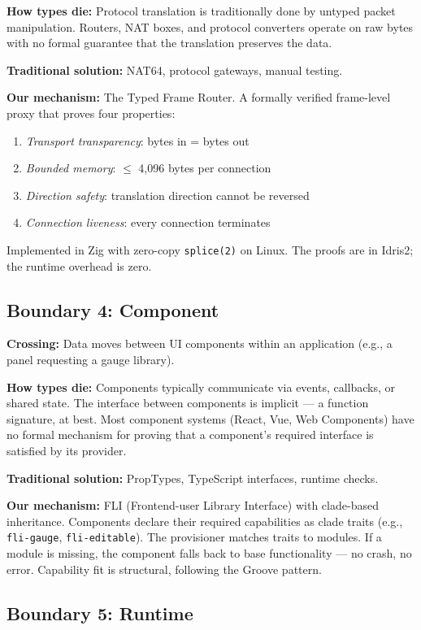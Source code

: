 \documentclass[11pt,a4paper]{article}
\begin{document}
\textbf{How types die:} Protocol translation is traditionally done by
untyped packet manipulation. Routers, NAT boxes, and protocol converters
operate on raw bytes with no formal guarantee that the translation
preserves the data.

\textbf{Traditional solution:} NAT64, protocol gateways, manual
testing.

\textbf{Our mechanism:} The Typed Frame Router. A formally verified
frame-level proxy that proves four properties:
\begin{enumerate}
\item \emph{Transport transparency}: bytes in = bytes out
\item \emph{Bounded memory}: $\leq$ 4,096 bytes per connection
\item \emph{Direction safety}: translation direction cannot be reversed
\item \emph{Connection liveness}: every connection terminates
\end{enumerate}

Implemented in Zig with zero-copy \texttt{splice(2)} on Linux. The
proofs are in Idris2; the runtime overhead is zero.

\subsection{Boundary 4: Component}

\textbf{Crossing:} Data moves between UI components within an
application (e.g., a panel requesting a gauge library).

\textbf{How types die:} Components typically communicate via events,
callbacks, or shared state. The interface between components is
implicit --- a function signature, at best. Most component systems
(React, Vue, Web Components) have no formal mechanism for proving
that a component's required interface is satisfied by its provider.

\textbf{Traditional solution:} PropTypes, TypeScript interfaces,
runtime checks.

\textbf{Our mechanism:} FLI (Frontend-user Library Interface) with
clade-based inheritance. Components declare their required capabilities
as clade traits (e.g., \texttt{fli-gauge}, \texttt{fli-editable}).
The provisioner matches traits to modules. If a module is missing,
the component falls back to base functionality --- no crash, no error.
Capability fit is structural, following the Groove pattern.

\subsection{Boundary 5: Runtime}
\end{document}
